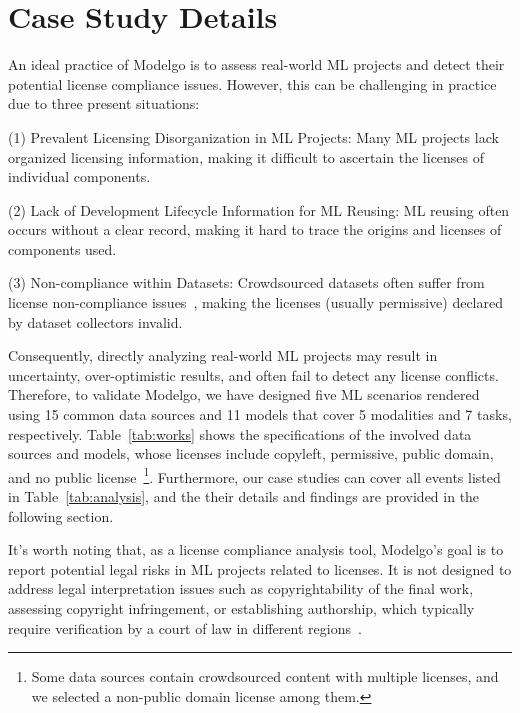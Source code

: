 \section{Case Study Details}
An ideal practice of Modelgo is to assess real-world ML projects and detect their potential license compliance issues. 
However, this can be challenging in practice due to three present situations:

(1) Prevalent Licensing Disorganization in ML Projects: Many ML projects lack organized licensing information, making it difficult to ascertain the licenses of individual components.

(2) Lack of Development Lifecycle Information for ML Reusing: ML reusing often occurs without a clear record, making it hard to trace the origins and licenses of components used.

(3) Non-compliance within Datasets: Crowdsourced datasets often suffer from license non-compliance issues~\cite{rajbahadur2021can}, making the licenses (usually permissive) declared by dataset collectors invalid.

Consequently, directly analyzing real-world ML projects may result in uncertainty, over-optimistic results, and often fail to detect any license conflicts.
Therefore, to validate Modelgo, we have designed five ML scenarios rendered using 15 common data sources and 11 models that cover 5 modalities and 7 tasks, respectively.
Table~\ref{tab:works} shows the specifications of the involved data sources and models, whose licenses include copyleft, permissive, public domain, and no public license~\footnote{Some data sources contain crowdsourced content with multiple licenses, and we selected a non-public domain license among them.}.
Furthermore, our case studies can cover all events listed in Table~\ref{tab:analysis}, and the their details and findings are provided in the following section.

It's worth noting that, as a license compliance analysis tool, Modelgo's goal is to report potential legal risks in ML projects related to licenses.
It is not designed to address legal interpretation issues such as copyrightability of the final work, assessing copyright infringement, or establishing authorship, which typically require verification by a court of law in different regions~\cite{national1979final, hedrick2019ithink, margoni2018artificial}.


